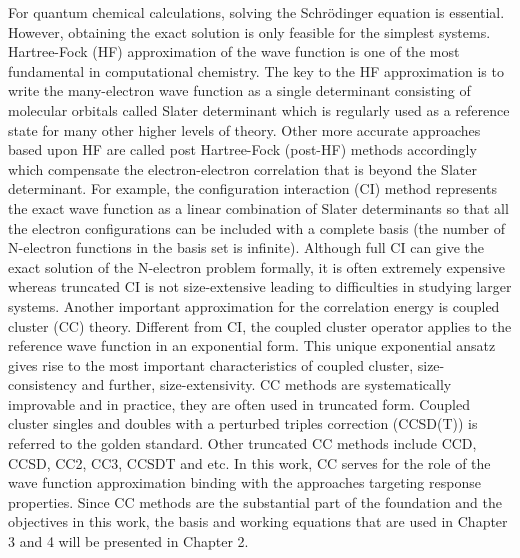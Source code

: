 For quantum chemical calculations, solving the Schr\"odinger equation is essential. However, obtaining the exact solution is only feasible for the simplest systems. Hartree-Fock (HF)\cite{Slater1951, Szabo2012} approximation of the wave function is one of the most fundamental in computational chemistry. The key to the HF approximation is to write the many-electron wave function as a single determinant consisting of molecular orbitals called Slater determinant which is regularly used as a reference state for many other higher levels of theory. Other more accurate approaches based upon HF are called post Hartree-Fock (post-HF) methods accordingly which compensate the electron-electron correlation that is beyond the Slater determinant. For example, the configuration interaction (CI) method\cite{Sherrill1999} represents the exact wave function as a linear combination of Slater determinants so that all the electron configurations can be included with a complete basis (the number of N-electron functions in the basis set is infinite). Although full CI can give the exact solution of the N-electron problem formally, it is often extremely expensive whereas truncated CI is not size-extensive leading to difficulties in studying larger systems. Another important approximation for the correlation energy is coupled cluster (CC) theory.\cite{Crawford2000} Different from CI, the coupled cluster operator applies to the reference wave function in an exponential form. This unique exponential ansatz gives rise to the most important characteristics of coupled cluster, size-consistency and further, size-extensivity. CC methods are systematically improvable and in practice, they are often used in truncated form. Coupled cluster singles and doubles with a perturbed triples correction (CCSD(T))\cite{Purvis1982} is referred to the golden standard. Other truncated CC methods include CCD, CCSD, CC2,\cite{Christiansen1995} CC3,\cite{Koch1997} CCSDT and etc. In this work, CC serves for the role of the wave function approximation binding with the approaches targeting response properties. Since CC methods are the substantial part of the foundation and the objectives in this work, the basis and working equations that are used in Chapter 3 and 4 will be presented in Chapter 2. 

